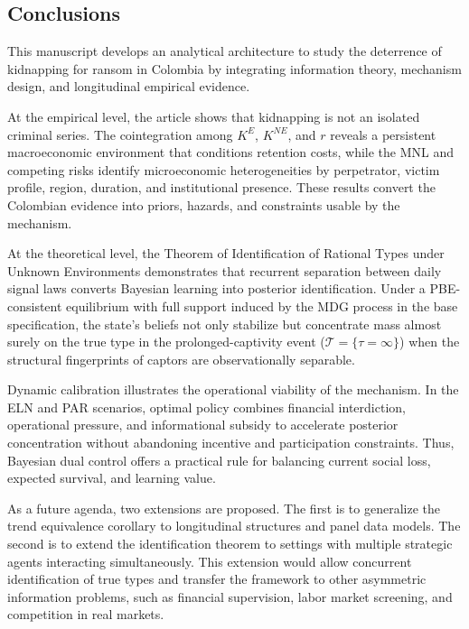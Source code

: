 \documentclass[ecta,nameyear,draft]{econsocart}
\theoremstyle{plain}
\theoremstyle{definition}
\newcommand{\1}{\mathbf{1}}
\begin{document}
\subsection{Conclusions}

This manuscript develops an analytical architecture to study the deterrence of kidnapping for ransom in Colombia by integrating information theory, mechanism design, and longitudinal empirical evidence.

At the empirical level, the article shows that kidnapping is not an isolated criminal series. The cointegration among $K^E$, $K^{NE}$, and $r$ reveals a persistent macroeconomic environment that conditions retention costs, while the MNL and competing risks identify microeconomic heterogeneities by perpetrator, victim profile, region, duration, and institutional presence. These results convert the Colombian evidence into priors, hazards, and constraints usable by the mechanism.

At the theoretical level, the Theorem of Identification of Rational Types under Unknown Environments demonstrates that recurrent separation between daily signal laws converts Bayesian learning into posterior identification. Under a PBE-consistent equilibrium with full support induced by the MDG process in the base specification, the state's beliefs not only stabilize but concentrate mass almost surely on the true type in the prolonged-captivity event ($\mathcal{T}=\{\tau=\infty\}$) when the structural fingerprints of captors are observationally separable.

Dynamic calibration illustrates the operational viability of the mechanism. In the ELN and PAR scenarios, optimal policy combines financial interdiction, operational pressure, and informational subsidy to accelerate posterior concentration without abandoning incentive and participation constraints. Thus, Bayesian dual control offers a practical rule for balancing current social loss, expected survival, and learning value.

As a future agenda, two extensions are proposed. The first is to generalize the trend equivalence corollary to longitudinal structures and panel data models. The second is to extend the identification theorem to settings with multiple strategic agents interacting simultaneously. This extension would allow concurrent identification of true types and transfer the framework to other asymmetric information problems, such as financial supervision, labor market screening, and competition in real markets.
\end{document}

